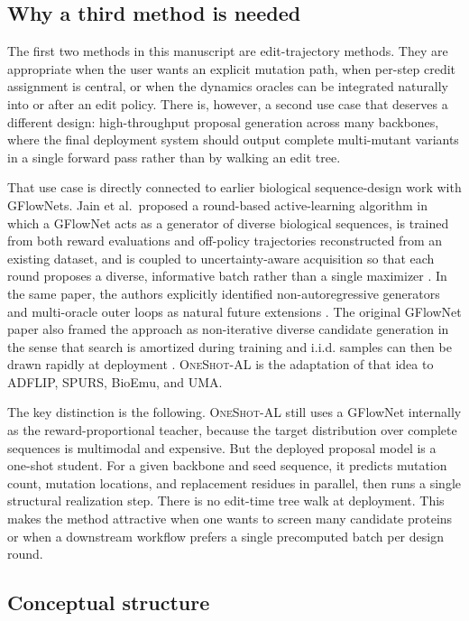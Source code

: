 \documentclass[11pt]{article}
\newcommand{\methodIII}{\textsc{OneShot-AL}}
\begin{document}
\subsection{Why a third method is needed}

The first two methods in this manuscript are edit-trajectory methods. They are appropriate when the user wants an explicit mutation path, when per-step credit assignment is central, or when the dynamics oracles can be integrated naturally into or after an edit policy. There is, however, a second use case that deserves a different design: high-throughput proposal generation across many backbones, where the final deployment system should output complete multi-mutant variants in a single forward pass rather than by walking an edit tree.

That use case is directly connected to earlier biological sequence-design work with GFlowNets. Jain et al.~proposed a round-based active-learning algorithm in which a GFlowNet acts as a generator of diverse biological sequences, is trained from both reward evaluations and off-policy trajectories reconstructed from an existing dataset, and is coupled to uncertainty-aware acquisition so that each round proposes a diverse, informative batch rather than a single maximizer \citep{jain2022bioseqgfn}. In the same paper, the authors explicitly identified non-autoregressive generators and multi-oracle outer loops as natural future extensions \citep{jain2022bioseqgfn}. The original GFlowNet paper also framed the approach as non-iterative diverse candidate generation in the sense that search is amortized during training and i.i.d. samples can then be drawn rapidly at deployment \citep{bengio2021noniter}. \methodIII{} is the adaptation of that idea to ADFLIP, SPURS, BioEmu, and UMA.

The key distinction is the following. \methodIII{} still uses a GFlowNet internally as the reward-proportional teacher, because the target distribution over complete sequences is multimodal and expensive. But the deployed proposal model is a one-shot student. For a given backbone and seed sequence, it predicts mutation count, mutation locations, and replacement residues in parallel, then runs a single structural realization step. There is no edit-time tree walk at deployment. This makes the method attractive when one wants to screen many candidate proteins or when a downstream workflow prefers a single precomputed batch per design round.

\subsection{Conceptual structure}
\end{document}
